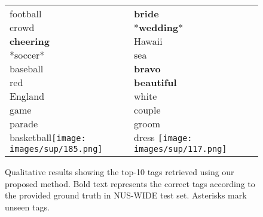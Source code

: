 \begin{figure*}
\begin{tabular}{lll}
\subcaptionbox*{football \\ crowd \\ \textbf{cheering} \\ *soccer* \\ baseball \\ red \\ England \\ game \\ parade \\ basketball}{\texttt{[image: images/sup/185.png]}} &

\subcaptionbox*{\textbf{bride} \\ *\textbf{wedding}* \\ Hawaii \\ sea \\ \textbf{bravo} \\ \textbf{beautiful} \\ white \\ couple \\ groom \\ dress }{\texttt{[image: images/sup/117.png]}}

\end{tabular}
\caption{Qualitative results showing the top-10 tags retrieved using our proposed method. Bold text represents the correct tags according to the provided ground truth in NUS-WIDE test set. Asterisks mark unseen tags.}
\label{fig:more_qualitative}
\end{figure*}



